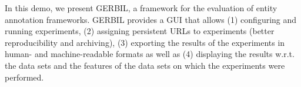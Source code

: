 In this demo, we present GERBIL, a framework for the evaluation of entity annotation frameworks. GERBIL provides a GUI that allows (1) configuring and running experiments, (2) assigning persistent URLs to experiments (better reproducibility and archiving), (3) exporting the results of the experiments in human- and machine-readable formats as well as (4) displaying the results w.r.t. the data sets and the features of the data sets on which the experiments were performed. %

